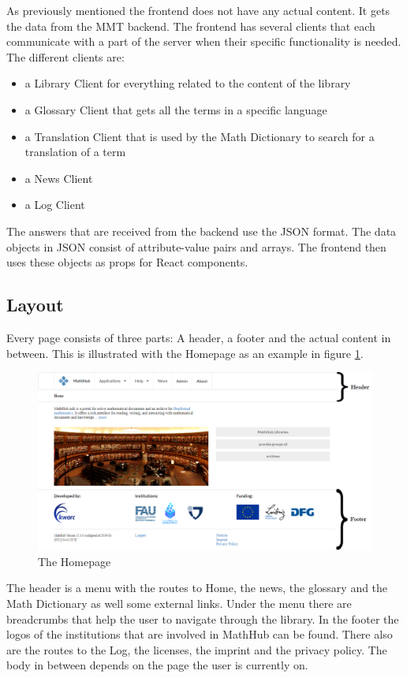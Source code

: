 \documentclass[11pt,a4paper]{article}
\begin{document}
As previously mentioned the frontend does not have any actual content.
It gets the data from the MMT backend.
The frontend has several clients that each communicate with a part of the server when their specific functionality is needed.
The different clients are:
\begin{itemize}
\item a Library Client for everything related to the content of the library
\item a Glossary Client that gets all the terms in a specific language
\item a Translation Client that is used by the Math Dictionary to search for a translation of a term 
\item a News Client
\item a Log Client
\end{itemize}

The answers that are received from the backend use the JSON format.
The data objects in JSON consist of attribute-value pairs and arrays.
The frontend then uses these objects as props for React components.

\subsection{Layout}
Every page consists of three parts: A header, a footer and the actual content in between.
This is illustrated with the Homepage as an example in figure \ref{fig:home}.

\begin{figure}[H]
\includegraphics[width=1\textwidth]{home2.png}
\caption{The Homepage}
\label{fig:home}
\end{figure}

The header is a menu with the routes to Home, the news, the glossary and the Math Dictionary as well some external links.
Under the menu there are breadcrumbs that help the user to navigate through the library.
In the footer the logos of the institutions that are involved in MathHub can be found.
There also are the routes to the Log, the licenses, the imprint and the privacy policy.
The body in between depends on the page the user is currently on.
\end{document}
